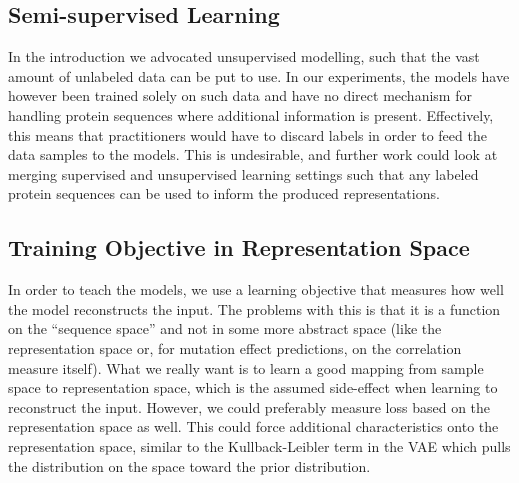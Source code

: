 
\subsection{Semi-supervised Learning}
In the introduction we advocated unsupervised modelling, such that the vast amount of unlabeled data can be put to use. In our experiments, the models have however been trained solely on such data and have no direct mechanism for handling protein sequences where additional information is present. Effectively, this means that practitioners would have to discard labels in order to feed the data samples to the models. This is undesirable, and further work could look at merging supervised and unsupervised learning settings such that any labeled protein sequences can be used to inform the produced representations.

\subsection{Training Objective in Representation Space}
In order to teach the models, we use a learning objective that measures how well the model reconstructs the input. The problems with this is that it is a function on the ``sequence space'' and not in some more abstract space (like the representation space or, for mutation effect predictions, on the correlation measure itself). What we really want is to learn a good mapping from sample space to representation space, which is the assumed side-effect when learning to reconstruct the input. However, we could preferably measure loss based on the representation space as well. This could force additional characteristics onto the representation space, similar to the Kullback-Leibler term in the VAE which pulls the distribution on the space toward the prior distribution.
